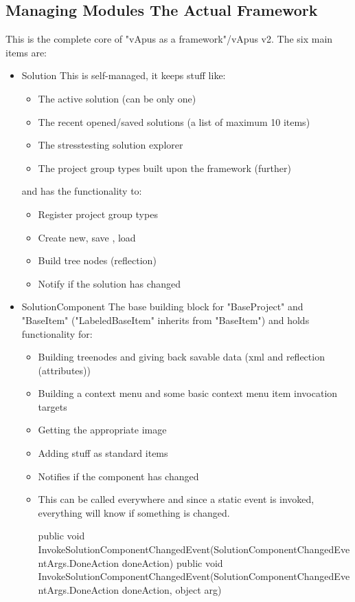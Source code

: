 \subsection{Managing Modules {The Actual Framework}}
This is the complete core of "vApus as a framework"/vApus v2. The six main items are:
\begin{itemize}
\item Solution
\npar
This is self-managed, it keeps stuff like:
\begin{itemize}
\item The active solution (can be only one)
\item The recent opened/saved solutions (a list of maximum 10 items)
\item The stresstesting solution explorer
\item The project group types built upon the framework (further)
\end{itemize}
\npar
and has the functionality to:
\begin{itemize}
\item Register project group types
\item Create new, save , load
\item Build tree nodes (reflection)
\item Notify if the solution has changed
\end{itemize}
\item SolutionComponent
\npar
The base building block for "BaseProject" and "BaseItem" ("LabeledBaseItem" inherits from "BaseItem") and holds functionality for:
\begin{itemize}
\item Building treenodes and giving back savable data (xml and reflection (attributes))
\item Building a context menu and some basic context menu item invocation targets
\item Getting the appropriate image
\item Adding stuff as standard items
\item Notifies if the component has changed
\item This can be called everywhere and since a static event is invoked, everything will know if something is changed.
\npar
\begin{codelisting}
public void InvokeSolutionComponentChangedEvent(SolutionComponentChangedEventArgs.DoneAction doneAction)
public void InvokeSolutionComponentChangedEvent(SolutionComponentChangedEventArgs.DoneAction doneAction, object arg)

\end{codelisting}
\end{itemize}
\end{itemize}
